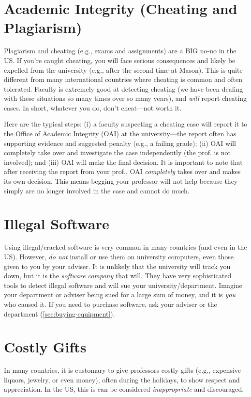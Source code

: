 \documentclass[oneside,11pt,dvipsnames]{book}
\begin{document}
\section{Academic Integrity (Cheating and Plagiarism)}

Plagiarism and cheating (e.g., exams and assignments) are a BIG no-no in the US.  If you're caught cheating, you will face serious consequences and likely be expelled from the university (e.g., after the second time at Mason).   This is quite different from many international countries where cheating is common and often tolerated.  Faculty is extremely good at detecting cheating (we have been dealing with these situations so many times over so many years), and \emph{will} report cheating cases.  In short, whatever you do, don't cheat---not worth it.

Here are the typical steps: (i) a faculty suspecting a cheating case will report it to the Office of Academic Integrity (OAI) at the university---the report often has supporting evidence and suggested penalty (e.g., a failing grade);  (ii)  OAI will completely take over and investigate the case independently (the prof. is not involved); and (iii) OAI will make the final decision.  It is important to note that after receiving the report from your prof., OAI \emph{completely} takes over and makes its own decision.  This means begging your professor will not help because they simply are no longer involved in the case and cannot do much.

\section{Illegal Software}\label{sec:illegal-software}
 Using illegal/cracked software is very common in many countries (and even in the US). However, \emph{do not} install or use them on university computers, even those given to you by your adviser.  It is unlikely that the university will track you down, but it is the \emph{software company} that will.  They have very sophisticated tools to detect illegal software and will sue your university/department.  Imagine your department or adviser being sued for a large sum of money, and it is \emph{you} who caused it.  If you need to purchase software,  ask your adviser or the department (\autoref{sec:buying-equipment}).


\section{Costly Gifts}\label{sec:gifts} In many countries, it is customary to give professors costly gifts (e.g., expensive liquors, jewelry, or even money), often during the holidays, to show respect and appreciation.  In the US, this is can be considered \emph{inappropriate} and discouraged. 
\end{document}
